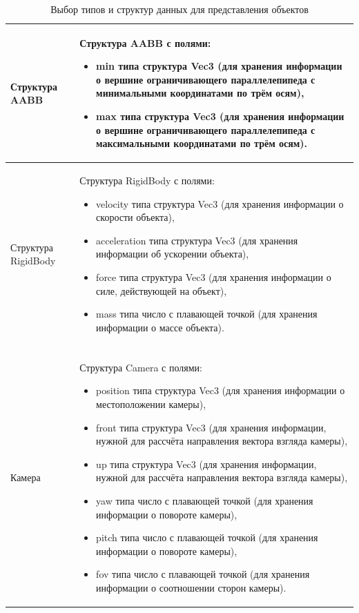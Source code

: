 \begin{longtable}{|p{}|p{}|}
        \hline
        Структура AABB
        &
        Структура AABB с полями:
        \begin{itemize}
            \item min типа структура Vec3 (для хранения информации о вершине ограничивающего параллелепипеда с минимальными координатами по трём осям),
            \item max типа структура Vec3 (для хранения информации о вершине ограничивающего параллелепипеда с максимальными координатами по трём осям).
        \end{itemize}
        \\
        \hline
        Структура RigidBody
        &
        Структура RigidBody с полями:
        \begin{itemize}
            \item velocity типа структура Vec3 (для хранения информации о скорости объекта),
            \item acceleration типа структура Vec3 (для хранения информации об ускорении объекта),
            \item force типа структура Vec3 (для хранения информации о силе, действующей на объект),
            \item mass типа число с плавающей точкой (для хранения информации о массе объекта).
        \end{itemize}
        \\

        \hline
        \newpage
        \caption{Выбор типов и структур данных для представления объектов} \vspace{0.3cm} \\

        \hline
        Камера
        &
        Структура Camera с полями:
        \begin{itemize}
            \item position типа структура Vec3 (для хранения информации о местоположении камеры),
            \item front типа структура Vec3 (для хранения информации, нужной для рассчёта направления вектора взгляда камеры),
            \item up типа структура Vec3 (для хранения информации, нужной для рассчёта направления вектора взгляда камеры),
            \item yaw типа число с плавающей точкой (для хранения информации о повороте камеры),
            \item pitch типа число с плавающей точкой (для хранения информации о повороте камеры),
            \item fov типа число с плавающей точкой (для хранения информации о соотношении сторон камеры).
        \end{itemize}
        \\
        \hline
    \end{longtable}

